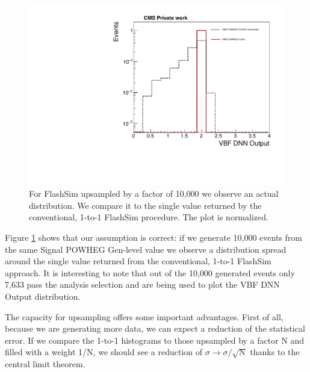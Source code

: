     \begin{figure}
    \centering
    \includegraphics[width=\linewidth]{gfx/ch6/1upsampled_HMM_amcatnlo_DNN18Atan___SignalRegion_log_norm.pdf}
    \caption[Upsampling]{For FlashSim upsampled by a factor of 10,000 we observe an actual distribution. We compare it to the single value returned by the conventional, 1-to-1 FlashSim procedure. The plot is normalized.}
    \label{fig:1upHMM}
   \end{figure}
   
   Figure \ref{fig:1upHMM} shows that our assumption is correct: if we generate 10,000 events from the same Signal POWHEG Gen-level value we observe a distribution spread around the single value returned from the conventional, 1-to-1 FlashSim approach. It is interesting to note that out of the 10,000 generated events only 7,633 pass the analysis selection and are being used to plot the VBF DNN Output distribution.
   
   The capacity for upsampling offers some important advantages. First of all, because we are generating more data, we can expect a reduction of the statistical error. If we compare the 1-to-1 histograms to those upsampled by a factor N and filled with a weight 1/N, we should see a reduction of $\sigma \rightarrow \sigma/\sqrt{\text{N}}$ thanks to the central limit theorem.
   
